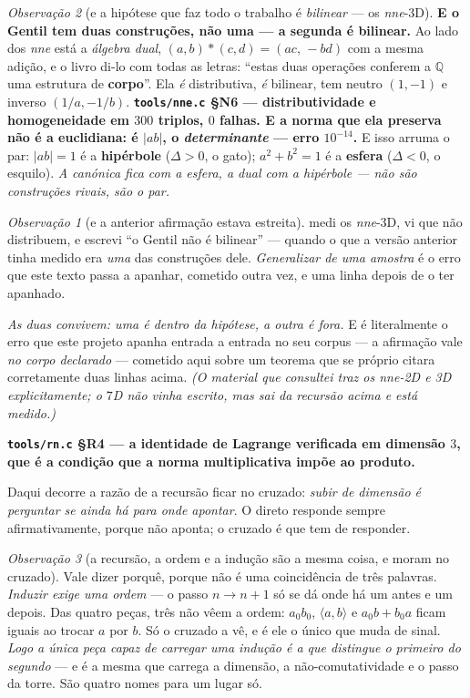 \documentclass[11pt]{article}
\newcommand{\code}[1]{\texttt{\small #1}}
\newcommand{\Q}{\mathbb Q}
\theoremstyle{plain}
\theoremstyle{remark}
\newtheorem{obs}{Observação}
\providecommand{\medido}[1]{\textbf{#1}}
\begin{document}
\begin{obs}[e a hipótese que faz todo o trabalho é \emph{bilinear} --- os \emph{nne}-3D]
\textbf{E o Gentil tem duas construções, não uma --- a segunda é bilinear.} Ao lado dos
\emph{nne} está a \emph{álgebra dual}, $(a,b)*(c,d)=(a c,\,-b d)$ com a mesma adição, e o livro
di-lo com todas as letras: ``estas duas operações conferem a $\Q$ uma estrutura de \textbf{corpo}''.
Ela \emph{é} distributiva, \emph{é} bilinear, tem neutro $(1,-1)$ e inverso $(1/a,-1/b)$.
\medido{\code{tools/nne.c} §N6 --- distributividade e homogeneidade em $300$ triplos, $0$ falhas.
E a norma que ela preserva não é a euclidiana: é $|ab|$, o \emph{determinante} --- erro
$10^{-14}$.}
E isso arruma o par: $|ab|=1$ é a \textbf{hipérbole} ($\Delta>0$, o gato); $a^2+b^2=1$ é a
\textbf{esfera} ($\Delta<0$, o esquilo). \emph{A canónica fica com a esfera, a dual com a
hipérbole --- não são construções rivais, são o par.}

\begin{obs}[e a anterior afirmação estava estreita]
medi os \emph{nne}-3D, vi que não distribuem, e escrevi ``o Gentil não é bilinear'' --- quando o
que a versão anterior tinha medido era \emph{uma} das construções dele. \emph{Generalizar de uma amostra} é o
erro que este texto passa a apanhar, cometido outra vez, e uma linha depois de o ter apanhado.
\end{obs}

\emph{As duas convivem: uma é dentro da hipótese, a outra é fora.} E é literalmente o erro que
este projeto apanha entrada a entrada no seu corpus --- a afirmação vale \emph{no corpo
declarado} --- cometido aqui sobre um teorema que se próprio citara corretamente duas linhas
acima. \emph{(O material que consultei traz os \emph{nne}-2D e 3D explicitamente; o $7$D não vinha
escrito, mas sai da recursão acima e está medido.)}
\end{obs}
\medido{\code{tools/rn.c} §R4 --- a identidade de Lagrange verificada em dimensão $3$, que é a
condição que a norma multiplicativa impõe ao produto.}

\noindent Daqui decorre a razão de a recursão ficar no cruzado: \emph{subir de dimensão é
perguntar se ainda há para onde apontar}. O direto responde sempre afirmativamente, porque não
aponta; o cruzado é que tem de responder.

\begin{obs}[a recursão, a ordem e a indução são a mesma coisa, e moram no cruzado]
Vale dizer porquê, porque não é uma coincidência de três palavras. \emph{Induzir exige uma ordem}
--- o passo $n\to n+1$ só se dá onde há um antes e um depois. Das quatro peças, três não vêem a
ordem: $a_0b_0$, $\langle a,b\rangle$ e $a_0b+b_0a$ ficam iguais ao trocar $a$ por $b$. Só o
cruzado a vê, e é ele o único que muda de sinal. \emph{Logo a única peça capaz de carregar uma
indução é a que distingue o primeiro do segundo} --- e é a mesma que carrega a dimensão, a
não-comutatividade e o passo da torre. São quatro nomes para um lugar só.
\end{obs}
\end{document}
